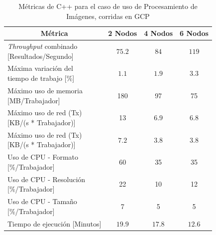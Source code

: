 \documentclass[11pt]{article}
\providecommand{\row}[1]{\parbox{150pt}{\setlength{\baselineskip}{0.2\baselineskip}\strut#1\strut}}
\newcommand{\ipcap}[2]{\caption{Métricas de #1 para el caso de uso de Procesamiento de Imágenes, corridas en #2}}
\newcommand{\english}[1]{\textit{#1}}
\begin{document}
\begin{table}[H]
\centering
\begin{tabular}{|l|c|c|c|}
\hline
\multicolumn{1}{|c|}{Métrica} & 2 Nodos & 4 Nodos & 6 Nodos \\ \hline
\row{\english{Throughput} combinado\\{[Resultados/Segundo]}} & $75.2$ & $84$ & $119$ \\ \hline
\row{Máxima variación del \\ tiempo de trabajo {[}\%{]}} & $1.1$ & $1.9$ & $3.3$ \\ \hline
\row{Máximo uso de memoria \\ {[MB/Trabajador]}} & 180 & 97 & 75 \\ \hline
\row{Máximo uso de red (Tx) \\ {[KB/(s * Trabajador)]}} & 13 & $6.9$ & $6.8$ \\ \hline
\row{Máximo uso de red (Tx) \\ {[KB/(s * Trabajador)]}} & $7.2$ & $3.8$ & $3.8$ \\ \hline
\row{Uso de CPU - Formato\\{[\%/Trabajador]}} & 60 & 35 & 35 \\ \hline
\row{Uso de CPU - Resolución\\{[\%/Trabajador]}} & 22 & 10 & 12 \\ \hline
\row{Uso de CPU - Tamaño\\{[\%/Trabajador]}} & 7 & 5 & 5 \\ \hline
Tiempo de ejecución [Minutos] & $19.9$ & $17.8$ & $12.6$ \\ \hline
\end{tabular}
\ipcap{C++}{GCP}
\end{table}
\end{document}
